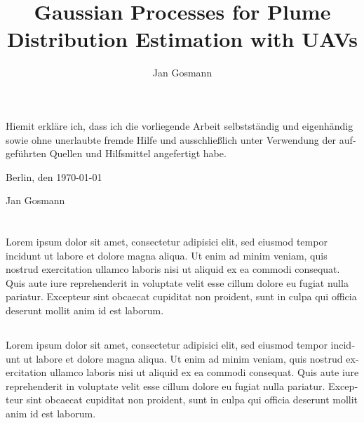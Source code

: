 \documentclass[11pt,a4paper,twoside,BCOR=15mm]{scrreprt}
\title{Gaussian Processes for Plume Distribution Estimation with UAVs}
\author{Jan Gosmann}
\begin{document}
\maketitle %

\thispagestyle{empty}
\begin{german}
    \vspace*{\fill}
    \noindent Hiemit erkläre ich, dass ich die vorliegende Arbeit selbstständig 
    und eigenhändig sowie ohne unerlaubte fremde Hilfe und ausschließlich unter 
    Verwendung der aufgeführten Quellen und Hilfsmittel angefertigt habe.

    \vspace{\intextsep}
    \noindent Berlin, den \today

    \vspace{\intextsep}
    \vspace{\intextsep}
    \noindent Jan Gosmann
    \vspace*{\fill}
    \vspace*{\fill}
\end{german}

\cleardoublepage\thispagestyle{empty}
\vspace*{\fill}
\section*{\abstractname}
Lorem ipsum dolor sit amet, consectetur adipisici elit, sed eiusmod tempor 
incidunt ut labore et dolore magna aliqua. Ut enim ad minim veniam, quis 
nostrud exercitation ullamco laboris nisi ut aliquid ex ea commodi 
consequat. Quis aute iure reprehenderit in voluptate velit esse cillum 
dolore eu fugiat nulla pariatur. Excepteur sint obcaecat cupiditat non 
proident, sunt in culpa qui officia deserunt mollit anim id est laborum.

\begin{german}
\section*{\abstractname}
Lorem ipsum dolor sit amet, consectetur adipisici elit, sed eiusmod tempor 
incidunt ut labore et dolore magna aliqua. Ut enim ad minim veniam, quis 
nostrud exercitation ullamco laboris nisi ut aliquid ex ea commodi 
consequat. Quis aute iure reprehenderit in voluptate velit esse cillum 
dolore eu fugiat nulla pariatur. Excepteur sint obcaecat cupiditat non 
proident, sunt in culpa qui officia deserunt mollit anim id est laborum.
\end{german}
\vspace*{\fill}
\end{document}
